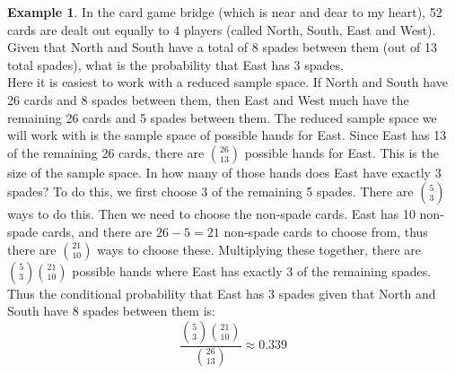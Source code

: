 \documentclass[12pt]{article}
\theoremstyle{definition}
\newtheorem*{example}{Example}
\theoremstyle{remark}
\begin{document}
\begin{example}In the card game bridge (which is near and dear to my heart), 52 cards are dealt out equally to 4 players (called North, South, East and West). Given that North and South have a total of 8 spades between them (out of 13 total spades), what is the probability that East has 3 spades.\\

Here it is easiest to work with a reduced sample space. If North and South have 26 cards and 8 spades between them, then East and West much have the remaining 26 cards and 5 spades between them. The reduced sample space we will work with is the sample space of possible hands for East. Since East has 13 of the remaining 26 cards, there are $\binom{26}{13}$ possible hands for East. This is the size of the sample space. In how many of those hands does East have exactly 3 spades? To do this, we first choose 3 of the remaining 5 spades. There are $\binom{5}{3}$ ways to do this. Then we need to choose the non-spade cards. East has 10 non-spade cards, and there are $26 - 5 = 21$ non-spade cards to choose from, thus there are $\binom{21}{10}$ ways to choose these. Multiplying these together, there are $\binom{5}{3}\binom{21}{10}$ possible hands where East has exactly 3 of the remaining spades. Thus the conditional probability that East has 3 spades given that North and South have 8 spades between them is:
\[
\frac{ \binom{5}{3}\binom{21}{10} }{\binom{26}{13}} \approx 0.339
\]
\end{example}
\end{document}
